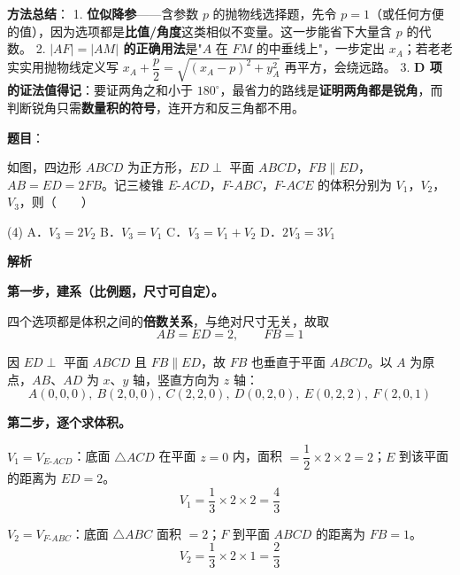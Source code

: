 \begin{answer}
\begin{gktip}
\textbf{方法总结}：
1. \textbf{位似降参}——含参数 $p$ 的抛物线选择题，先令 $p=1$（或任何方便的值），因为选项都是\textbf{比值/角度}这类相似不变量。这一步能省下大量含 $p$ 的代数。
2. \textbf{$|AF|=|AM|$ 的正确用法}是"$A$ 在 $FM$ 的中垂线上"，一步定出 $x_A$；若老老实实用抛物线定义写 $x_A+\dfrac p2=\sqrt{(x_A-p)^2+y_A^2}$ 再平方，会绕远路。
3. \textbf{D 项的证法值得记}：要证两角之和小于 $180^\circ$，最省力的路线是\textbf{证明两角都是锐角}，而判断锐角只需\textbf{数量积的符号}，连开方和反三角都不用。
\end{gktip}


\par\medskip

\end{answer}
\begin{answer}

\textbf{题目}：

如图，四边形 $ABCD$ 为正方形，$ED\perp$ 平面 $ABCD$，$FB\parallel ED$，$AB=ED=2FB$。记三棱锥 $E\text{-}ACD$，$F\text{-}ABC$，$F\text{-}ACE$ 的体积分别为 $V_1$，$V_2$，$V_3$，则\mbox{（　　）}
\nopagebreak[4]
\begin{center}\end{center}
\nopagebreak[4]
\begin{gkopts}(4)
\task A．$V_3=2V_2$
\task B．$V_3=V_1$
\task C．$V_3=V_1+V_2$
\task D．$2V_3=3V_1$
\end{gkopts}

\textbf{解析}

\textbf{第一步，建系（比例题，尺寸可自定）。}

四个选项都是体积之间的\textbf{倍数关系}，与绝对尺寸无关，故取
\nopagebreak[4]
\[AB=ED=2,\qquad FB=1\]

因 $ED\perp$ 平面 $ABCD$ 且 $FB\parallel ED$，故 $FB$ 也垂直于平面 $ABCD$。以 $A$ 为原点，$AB$、$AD$ 为 $x$、$y$ 轴，竖直方向为 $z$ 轴：
\nopagebreak[4]
\[A(0,0,0),\ B(2,0,0),\ C(2,2,0),\ D(0,2,0),\ E(0,2,2),\ F(2,0,1)\]

\textbf{第二步，逐个求体积。}

\textbf{$V_1=V_{E\text{-}ACD}$}：底面 $\triangle ACD$ 在平面 $z=0$ 内，面积 $=\dfrac12\times2\times2=2$；$E$ 到该平面的距离为 $ED=2$。
\nopagebreak[4]
\[V_1=\frac13\times2\times2=\frac43\]

\textbf{$V_2=V_{F\text{-}ABC}$}：底面 $\triangle ABC$ 面积 $=2$；$F$ 到平面 $ABCD$ 的距离为 $FB=1$。
\nopagebreak[4]
\[V_2=\frac13\times2\times1=\frac23\]


\end{answer}

